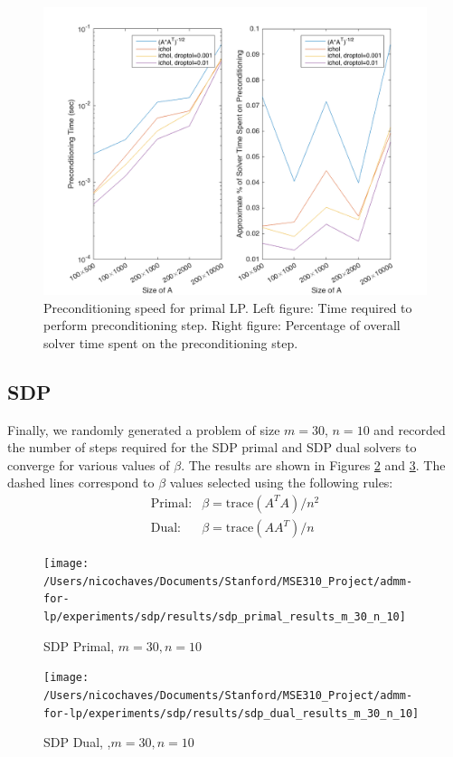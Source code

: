 \documentclass{article}
\begin{document}
\begin{figure}[ht]
	\centering
	\includegraphics[height=0.5\textwidth]{../../experiments/incomplete_cholesky/ichol_speed_primal_various_A.png}
	\caption{Preconditioning speed for primal LP. Left figure: Time required to perform preconditioning step. Right figure: Percentage of overall solver time spent on the preconditioning step.}
	\label{fig:ichol_primal_speed}
\end{figure}

\subsection*{SDP}

Finally, we randomly generated a problem of size $m=30$, $n=10$ and recorded the number of steps required for the SDP primal and SDP dual solvers to converge for various values of $\beta$. The results are shown in Figures \ref{fig:sdp_primal} and \ref{fig:sdp_dual}. The dashed lines correspond to $\beta$ values selected using the following rules:
\begin{eqnarray*}
\text{Primal:} & \beta=\text{trace}(A^{T}A)/n^{2}\\
\text{Dual:} & \beta=\text{trace}(AA^{T})/n
\end{eqnarray*}

\begin{figure}[ht]
	\centering
	\texttt{[image: /Users/nicochaves/Documents/Stanford/MSE310\_Project/admm-for-lp/experiments/sdp/results/sdp\_primal\_results\_m\_30\_n\_10]}
	\caption{SDP Primal, $m=30, n=10$}
	\label{fig:sdp_primal}
\end{figure}

\begin{figure}[ht]
	\centering
	\texttt{[image: /Users/nicochaves/Documents/Stanford/MSE310\_Project/admm-for-lp/experiments/sdp/results/sdp\_dual\_results\_m\_30\_n\_10]}
	\caption{SDP Dual, ,$m=30, n=10$}
	\label{fig:sdp_dual}
\end{figure}
\end{document}
